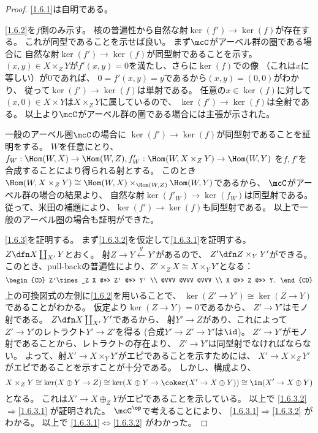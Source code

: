 \documentclass[uplatex,dvipdfmx]{jsarticle}
\begin{document}
\begin{proof}
  \ref{1.6.1}は自明である。

  \ref{1.6.2}を\(f\)側のみ示す。
  核の普遍性から自然な射\(\ker(f')\to \ker(f)\)が存在する。
  これが同型であることを示せば良い。
  まず\(\mcC\)がアーベル群の圏である場合に
  自然な射\(\ker(f')\to \ker(f)\)が同型射であることを示す。
  \((x,y)\in X\times_ZY\)が\(f'(x,y)=0\)を満たし、さらに\(\ker(f)\)での像
  （これは\(x\)に等しい）が\(0\)であれば、
  \(0 = f'(x,y) = y\)であるから\((x,y) = (0,0)\)がわかり、
  従って\(\ker(f')\to \ker(f)\)は単射である。
  任意の\(x\in \ker(f)\)に対して
  \((x,0)\in X\times Y\)は\(X\times_ZY\)に属しているので、
  \(\ker(f')\to \ker(f)\)は全射である。
  以上より\(\mcC\)がアーベル群の圏である場合には主張が示された。

  一般のアーベル圏\(\mcC\)の場合に
  \(\ker(f')\to \ker(f)\)が同型射であることを証明をする。
  \(W\)を任意にとり、
  \(f_W:\Hom(W,X)\to \Hom(W,Z), f'_W:\Hom(W,X\times_ZY)\to \Hom(W,Y)\)
  を\(f,f'\)を合成することにより得られる射とする。
  このとき\(\Hom(W,X\times_ZY)\cong \Hom(W,X)\times_{\Hom(W,Z)}\Hom(W,Y)\)であるから、
  \(\mcC\)がアーベル群の場合の結果より、
  自然な射\(\ker(f'_W)\to \ker(f_W)\)は同型射である。
  従って、米田の補題により、\(\ker(f')\to \ker(f)\)も同型射である。
  以上で一般のアーベル圏の場合も証明ができた。

  \ref{1.6.3}を証明する。
  まず\ref{1.6.3.2}を仮定して\ref{1.6.3.1}を証明する。
  \(Z\dfn X\coprod_{X'}Y\)とおく。
  射\(Z\to Y\xleftarrow{g} Y'\)があるので、
  \(Z'\dfn Z\times_YY'\)ができる。
  このとき、pull-backの普遍性により、\(Z'\times_Z X \cong X\times_YY'\)となる：
  \[
  \begin{CD}
    Z'\times_Z X @>>> Z' @>>> Y' \\
    @VVV @VVV @VVV \\
    X @>>> Z @>>> Y.
  \end{CD}
  \]
  上の可換図式の左側に\ref{1.6.2}を用いることで、
  \(\ker(Z'\to Y')\cong \ker(Z\to Y)\)であることがわかる。
  仮定より\(\ker(Z\to Y) = 0\)であるから、
  \(Z'\to Y'\)はモノ射である。
  \(Z \dfn X\coprod_{X'}Y'\)であるから、
  射\(Y'\to Z\)があり、これによって\(Z'\to Y'\)のレトラクト\(Y'\to Z'\)を得る
  (合成\(Y'\to Z'\to Y'\)は\(\id\))。
  \(Z'\to Y'\)がモノ射であることから、レトラクトの存在より、
  \(Z'\to Y'\)は同型射でなければならない。
  よって、射\(X'\to X\times_YY'\)がエピであることを示すためには、
  \(X'\to X\times_ZY'\)がエピであることを示すことが十分である。
  しかし、構成より、
  \[
  X\times_ZY \cong \ker(X\oplus Y \to Z)
  \cong \ker(X\oplus Y \to \coker(X' \to X\oplus Y))
  \cong \im(X' \to X\oplus Y)
  \]
  となる。
  これは\(X'\to X\oplus_ZY\)がエピであることを示している。
  以上で
  \ref{1.6.3.2}\(\Rightarrow\)\ref{1.6.3.1}
  が証明された。
  \(\mcC^{\op}\)で考えることにより、
  \ref{1.6.3.1}\(\Rightarrow\)\ref{1.6.3.2}
  がわかる。
  以上で
  \ref{1.6.3.1}\(\Leftrightarrow\)\ref{1.6.3.2}
  がわかった。


\end{proof}
\end{document}
